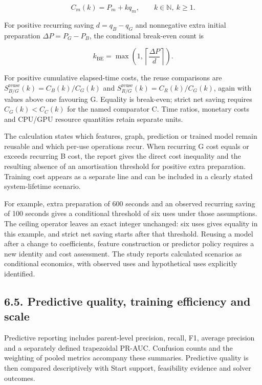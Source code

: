 \documentclass[
  british,
  10pt,
]{article}
\begin{document}
\[
C_m(k)=P_m+kq_m,\qquad k\in\mathbb N,\ k\ge1.
\tag{6}
\]

For positive recurring saving \(d=q_B-q_G\) and nonnegative extra
initial preparation \(\Delta P=P_G-P_B\), the conditional break-even
count is

\[
k_{\mathrm{BE}}=\max\!\left(1,\left\lceil\frac{\Delta P}{d}\right\rceil\right).
\tag{7}
\]

For positive cumulative elapsed-time costs, the reuse comparisons are
\(S^{\mathrm{reuse}}_{B/G}(k)=C_B(k)/C_G(k)\) and
\(S^{\mathrm{reuse}}_{R/G}(k)=C_R(k)/C_G(k)\), again with values above
one favouring G. Equality is break-even; strict net saving requires
\(C_G(k)<C_C(k)\) for the named comparator C. Time ratios, monetary
costs and CPU/GPU resource quantities retain separate units.

The calculation states which features, graph, prediction or trained
model remain reusable and which per-use operations recur. When recurring
G cost equals or exceeds recurring B cost, the report gives the direct
cost inequality and the resulting absence of an amortisation threshold
for positive extra preparation. Training cost appears as a separate line
and can be included in a clearly stated system-lifetime scenario.

For example, extra preparation of 600 seconds and an observed recurring
saving of 100 seconds gives a conditional threshold of six uses under
those assumptions. The ceiling operator leaves an exact integer
unchanged: six uses gives equality in this example, and strict net
saving starts after that threshold. Reusing a model after a change to
coefficients, feature construction or predictor policy requires a new
identity and cost assessment. The study reports calculated scenarios as
conditional economics, with observed uses and hypothetical uses
explicitly identified.

\subsection{6.5. Predictive quality, training efficiency and
scale}\label{predictive-quality-training-efficiency-and-scale}

Predictive reporting includes parent-level precision, recall, F1,
average precision and a separately defined trapezoidal PR-AUC. Confusion
counts and the weighting of pooled metrics accompany these summaries.
Predictive quality is then compared descriptively with Start support,
feasibility evidence and solver outcomes.
\end{document}

